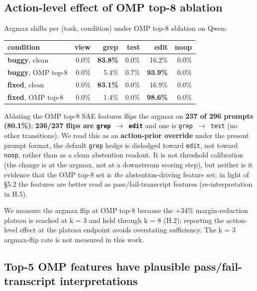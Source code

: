 \documentclass[
  11pt,
  a4paper]{article}
\newcounter{none} %
\begin{document}
\subsection{Action-level effect of OMP top-8
ablation}\label{action-level-effect-of-omp-top-8-ablation}

Argmax shifts per (task, condition) under OMP top-8 ablation on Qwen:

{\def\LTcaptype{none} %
\begin{longtable}[]{@{}lrrrrr@{}}
\toprule\noalign{}
condition & view & grep & test & edit & noop \\
\midrule\noalign{}
\endhead
\bottomrule\noalign{}
\endlastfoot
\textbf{buggy}, clean & 0.0\% & \textbf{83.8\%} & 0.0\% & 16.2\% &
0.0\% \\
\textbf{buggy}, OMP top-8 & 0.0\% & 5.4\% & 0.7\% & \textbf{93.9\%} &
0.0\% \\
\textbf{fixed}, clean & 0.0\% & \textbf{83.1\%} & 0.0\% & 16.9\% &
0.0\% \\
\textbf{fixed}, OMP top-8 & 0.0\% & 1.4\% & 0.0\% & \textbf{98.6\%} &
0.0\% \\
\end{longtable}
}

Ablating the OMP top-8 SAE features flips the argmax on \textbf{237 of
296 prompts (80.1\%)}; \textbf{236/237 flips are \texttt{grep\ \ensuremath{\rightarrow}\ edit}}
and one is \texttt{grep\ \ensuremath{\rightarrow}\ test} (no other transitions). We read this
as an \textbf{action-prior override} under the present prompt format,
the default \texttt{grep} hedge is dislodged toward \texttt{edit}, not
toward \texttt{noop}, rather than as a clean abstention readout. It is
not threshold calibration (the change is at the argmax, not at a
downstream scoring step), but neither is it evidence that the OMP top-8
set is \emph{the} abstention-driving feature set; in light of \S{}5.2 the
features are better read as pass/fail-transcript features
(re-interpretation in H.5).

We measure the argmax flip at OMP top-8 because the +34\%
margin-reduction plateau is reached at k = 3 and held through k = 8
(H.2); reporting the action-level effect at the plateau endpoint avoids
overstating sufficiency. The k = 3 argmax-flip rate is not measured in
this work.

\subsection{Top-5 OMP features have plausible pass/fail-transcript
interpretations}\label{top-5-omp-features-have-plausible-passfail-transcript-interpretations}
\end{document}

